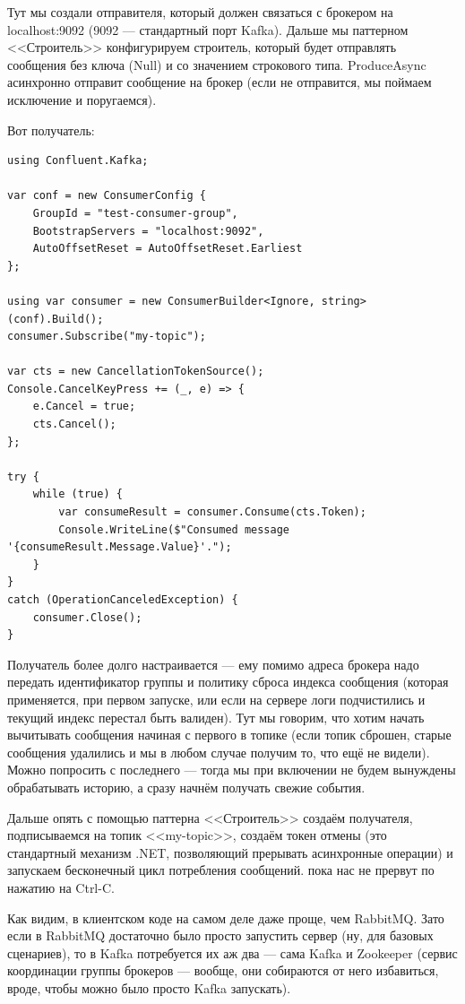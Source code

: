 \documentclass{../../text-style}
\begin{document}
Тут мы создали отправителя, который должен связаться с брокером на localhost:9092 (9092 --- стандартный порт Kafka). Дальше мы паттерном <<Строитель>> конфигурируем строитель, который будет отправлять сообщения без ключа (Null) и со значением строкового типа. ProduceAsync асинхронно отправит сообщение на брокер (если не отправится, мы поймаем исключение и поругаемся).

Вот получатель: 

\begin{verbatim}
using Confluent.Kafka;

var conf = new ConsumerConfig {
    GroupId = "test-consumer-group",
    BootstrapServers = "localhost:9092",
    AutoOffsetReset = AutoOffsetReset.Earliest
};

using var consumer = new ConsumerBuilder<Ignore, string>(conf).Build();
consumer.Subscribe("my-topic");

var cts = new CancellationTokenSource();
Console.CancelKeyPress += (_, e) => {
    e.Cancel = true;
    cts.Cancel();
};

try {
    while (true) {
        var consumeResult = consumer.Consume(cts.Token);
        Console.WriteLine($"Consumed message '{consumeResult.Message.Value}'.");
    }
}
catch (OperationCanceledException) {
    consumer.Close();
}
\end{verbatim}

Получатель более долго настраивается --- ему помимо адреса брокера надо передать идентификатор группы и политику сброса индекса сообщения (которая применяется, при первом запуске, или если на сервере логи подчистились и текущий индекс перестал быть валиден). Тут мы говорим, что хотим начать вычитывать сообщения начиная с первого в топике (если топик сброшен, старые сообщения удалились и мы в любом случае получим то, что ещё не видели). Можно попросить с последнего --- тогда мы при включении не будем вынуждены обрабатывать историю, а сразу начнём получать свежие события.

Дальше опять с помощью паттерна <<Строитель>> создаём получателя, подписываемся на топик <<my-topic>>, создаём токен отмены (это стандартный механизм .NET, позволяющий прерывать асинхронные операции) и запускаем бесконечный цикл потребления сообщений. пока нас не прервут по нажатию на Ctrl-C.

Как видим, в клиентском коде на самом деле даже проще, чем RabbitMQ. Зато если в RabbitMQ достаточно было просто запустить сервер (ну, для базовых сценариев), то в Kafka потребуется их аж два --- сама Kafka и Zookeeper (сервис координации группы брокеров --- вообще, они собираются от него избавиться, вроде, чтобы можно было просто Kafka запускать).

\end{document}
